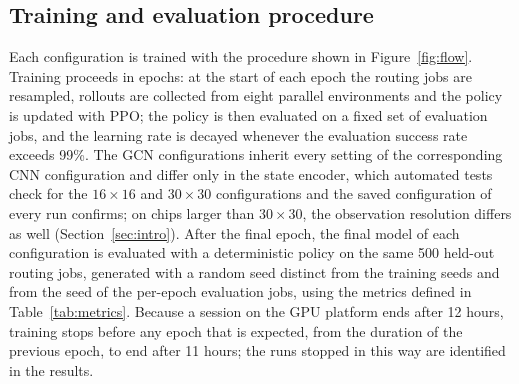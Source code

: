 \documentclass[11pt,a4paper]{article}
\begin{document}
\subsection{Training and evaluation procedure}
Each configuration is trained with the procedure shown in
Figure~\ref{fig:flow}. Training proceeds in epochs: at the start of each
epoch the routing jobs are resampled, rollouts are collected from eight
parallel environments and the policy is updated with PPO; the policy is then
evaluated on a fixed set of evaluation jobs, and the learning rate is decayed
whenever the evaluation success rate exceeds 99\%. The GCN configurations
inherit every setting of the corresponding CNN configuration and differ only
in the state encoder, which automated tests check for the $16\times16$ and
$30\times30$ configurations and the saved configuration of every run
confirms; on chips larger
than $30\times30$, the observation resolution differs as well (Section~\ref{sec:intro}).
After the final epoch, the final model of each configuration is evaluated with
a deterministic policy on the same 500 held-out routing jobs, generated with a
random seed distinct from the training seeds and from the seed of the
per-epoch evaluation jobs, using the metrics defined in
Table~\ref{tab:metrics}. Because a session on the GPU platform ends after
12 hours, training stops before any epoch that is expected, from the duration
of the previous epoch, to end after 11 hours; the
runs stopped in this way are identified in the results.
\end{document}
